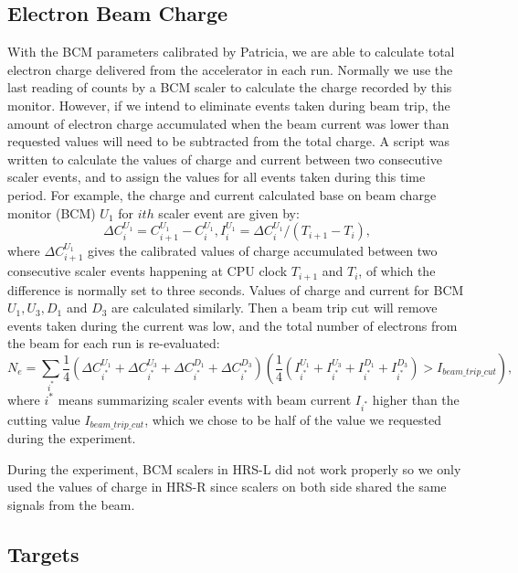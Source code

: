 \documentclass[a4paper,10.5pt]{report}
\begin{document}
\subsection{Electron Beam Charge}
 With the BCM parameters calibrated by Patricia, we are able to calculate total electron charge delivered from the accelerator in each run. Normally we use the last reading of counts by a BCM scaler to calculate the charge recorded by this monitor. However, if we intend to eliminate events taken during beam trip, the amount of electron charge accumulated when the beam current was lower than requested values will need to be subtracted from the total charge. A script was written to calculate the values of charge and current between two consecutive scaler events, and to assign the values for all events taken during this time period. For example, the charge and current calculated base on beam charge monitor (BCM) $U_{1}$ for $ith$ scaler event are given by:
\begin{equation}
  \Delta C_{i}^{U_{1}} = C_{i+1}^{U_{1}} - C_{i}^{U_{1}},  I_{i}^{U_{1}} = \Delta C_{i}^{U_{1}}/(T_{i+1}-T_{i}),
\end{equation}
where $\Delta C_{i+1}^{U_{1}}$ gives the calibrated values of charge accumulated between two consecutive scaler events happening at CPU clock $T_{i+1}$ and $T_{i}$, of which the difference is normally set to three seconds. Values of charge and current for BCM $U_{1}, U_{3}, D_{1}$ and $D_{3}$ are calculated similarly. Then a beam trip cut will remove events taken during the current was low, and the total number of electrons from the beam for each run is re-evaluated:
\begin{equation}
  N_{e} = \sum_{i^{*}} \frac{1}{4}(\Delta C_{i^{*}}^{U_{1}}+\Delta C_{i^{*}}^{U_{3}}+\Delta C_{i^{*}}^{D_{1}}+\Delta C_{i^{*}}^{D_{3}})(\frac{1}{4}(I_{i^{*}}^{U_{1}}+I_{i^{*}}^{U_{3}}+I_{i^{*}}^{D_{1}}+I_{i^{*}}^{D_{3}})>I_{beam\_trip\_cut}),
  \label{eq_ne}
\end{equation}
where $i^{*}$ means summarizing scaler events with beam current $I_{i^{*}}$ higher than the cutting value $I_{beam\_trip\_cut}$, which we chose to be half of the value we requested during the experiment.

During the experiment, BCM scalers in HRS-L did not work properly so we only used the values of charge in HRS-R since scalers on both side shared the same signals from the beam.

\subsection{Targets}
\end{document}
